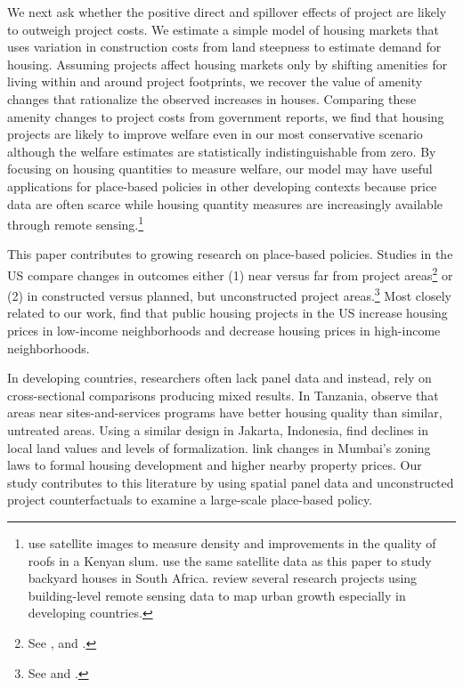\documentclass[12pt]{article}
\begin{document}
We next ask whether the positive direct and spillover effects of project are likely to outweigh project costs.  We estimate a simple model of housing markets that uses variation in construction costs from land steepness to estimate demand for housing.  Assuming projects affect housing markets only by shifting amenities for living within and around project footprints, we recover the value of amenity changes that rationalize the observed increases in houses.  Comparing these amenity changes to project costs from government reports, we find that housing projects are likely to improve welfare even in our most conservative scenario although the welfare estimates are statistically indistinguishable from zero.  By focusing on housing quantities to measure welfare, our model may have useful applications for place-based policies in other developing contexts because price data are often scarce while housing quantity measures are increasingly available through remote sensing.\footnote{ \cite{marxthere} use satellite images to measure density and improvements in the quality of roofs in a Kenyan slum.  \cite{Brueckner2018backyarding} use the same satellite data as this paper to study backyard houses in South Africa. \cite{donaldson2016view} review several research projects using building-level remote sensing data to map urban growth especially in developing countries. }  


 
This paper contributes to growing research on place-based policies.  Studies in the US compare changes in outcomes either (1) near versus far from project areas\footnote{See \cite{rossi2010housing,hornbeck2017creative}, and \cite{diamond2016wants}.} or (2) in constructed versus planned, but unconstructed project areas.\footnote{See \cite{busso2013assessing} and \cite{kline2013local}.}  Most closely related to our work, \cite{diamond2016wants} find that public housing projects in the US increase housing prices in low-income neighborhoods and decrease housing prices in high-income neighborhoods.  

In developing countries, researchers often lack panel data and instead, rely on cross-sectional comparisons producing mixed results.  In Tanzania, \cite{baruah2017planning} observe that areas near sites-and-services programs have better housing quality than similar, untreated areas.  Using a similar design in Jakarta, Indonesia, \cite{harari2018slum} find declines in local land values and levels of formalization.  \cite{gechter2018slums} link changes in Mumbai's zoning laws to formal housing development and higher nearby property prices.  Our study contributes to this literature by using spatial panel data and unconstructed project counterfactuals to examine a large-scale place-based policy.
\end{document}
